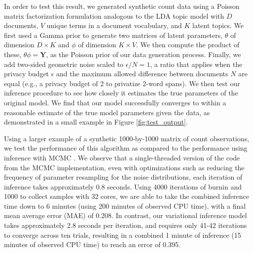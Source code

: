 \documentclass[letterpaper]{article}
\newcommand{\Yten}{\pmb{Y}}
\begin{document}
  In order to test this result, we generated synthetic count data using a
  Poisson matrix factorization formulation analogous to the LDA topic model
  \citep{blei2003latent} with $D$ documents, $V$ unique terms in a document
  vocabulary, and $K$ latent topics. We first used a Gamma prior to generate two
  matrices of latent parameters, $\theta$ of dimension $D \times K$ and $\phi$
  of dimension $K \times V$. We then compute the product of these, $\theta \phi
  = \Yten$, as the Poisson prior of our data generation process. Finally, we add
  two-sided geometric noise scaled to $\epsilon / N = 1$, a ratio that applies
  when the privacy budget $\epsilon$ and the maximum allowed difference between
  documents $N$ are equal (e.g., a privacy budget of 2 to privatize 2-word
  spans). We then test our inference procedure to see how closely it estimates
  the true parameters of the original model. We find that our model successfully
  converges to within a reasonable estimate of the true model parameters given
  the data, as demonstrated in a small example in Figure \ref{fig:test_output}.
  
  
  Using a larger example of a synthetic 1000-by-1000 matrix of count
  observations, we test the performance of this algorithm as compared to the
  performance using inference with MCMC \citep{schein2018locally}. We observe
  that a single-threaded version of the code from the MCMC implementation, even
  with optimizations such as reducing the frequency of parameter resampling for
  the noise distributions, each iteration of inference takes approximately 0.8
  seconds. Using 4000 iterations of burnin and 1000 to collect samples with 32
  cores, we are able to take the combined inference time down to 6 minutes
  (using 200 minutes of observed CPU time), with a final mean average error
  (MAE) of 0.208. In contrast, our variational inference model takes
  approximately 2.8 seconds per iteration, and requires only 41-42 iterations to
  converge across ten trials, resulting in a combined 1 minute of inference (15
  minutes of observed CPU time) to reach an error of 0.395.  
\end{document}
